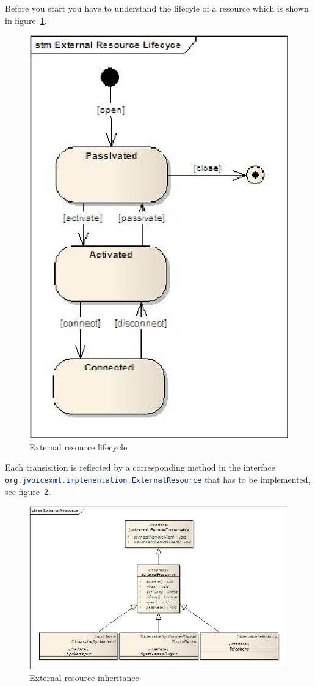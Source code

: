\documentclass[11pt,a4paper]{book}
\begin{document}
Before you start you have to understand the lifecyle of a resource which is
shown in figure~\ref{fig:external-resource-lifecycle}.
\begin{figure}[htp]
\begin{center}
  \includegraphics[width=0.4\linewidth]{stm-external-resource-lifecycle}
  \caption{External resource lifecycle}
  \label{fig:external-resource-lifecycle}
\end{center}
\end{figure}
Each transisition is reflected by a corresponding method in the interface
\lstinline[language=Java]{org.jvoicexml.implementation.ExternalResource}
that has to be implemented, see figure~\ref{fig:external-resource}.
\begin{figure}[htp]
\begin{center}
  \includegraphics[width=\linewidth]{class-external-resource}
  \caption{External resource inheritance}
  \label{fig:external-resource}
\end{center}
\end{figure}
\end{document}
